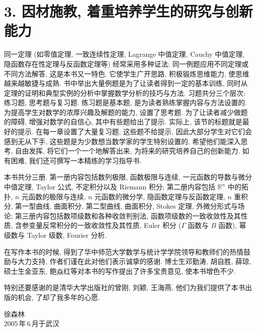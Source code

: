 \section*{3. 因材施教, 着重培养学生的研究与创新能力}

同一定理 (如零值定理, 一致连续性定理, Lagrange 中值定理, Cauchy 中值定理, 隐函数存在性定理与反函数定理等) 经常采用多种证法; 同一例题应用不同定理或不同方法解答, 这是本书又一特色. 它使学生广开思路, 积极锻炼思维能力, 使思维越来越敏捷与成熟. 书中举出大量例题是为了让读者得到一定的基本训练, 同时从定理的证明和典型实例的分析中掌握数学分析的技巧与方法. 习题共分三个层次: 练习题, 思考题与复习题. 练习题是基本题, 是为读者熟练掌握内容与方法设置的. 为提高学生对数学的浓厚兴趣及解题的能力, 设置了思考题. 为了让读者减少做题的障碍, 增强对数学的自信心, 其中有些题给出了提示. 实际上, 该节的标题就是最好的提示. 在每一章设置了大量复习题, 这些题不给提示, 因此大部分学生对它们会感到无从下手, 这些题是为少数想当数学家的学生特别设置的, 希望他们能深入思考, 自由发挥, 将它们一个一个地解答出来, 为将来的研究培养自己的创新能力. 如有困难, 我们还可撰写一本精练的学习指导书.

本书共分三册. 第一册内容包括数列极限, 函数极限与连续, 一元函数的导数与微分中值定理, Taylor 公式, 不定积分以及 Riemann 积分; 第二册内容包括 $\mathbb{R}^n$ 中的拓扑, $n$ 元函数的极限与连续, $n$ 元函数的微分学, 隐函数定理与反函数定理, $n$ 重积分, 第一型曲线, 曲面积分, 第二型曲线, 曲面积分, Stokes 定理, 外微分形式与场论; 第三册内容包括数项级数和各种收敛判别法, 函数项级数的一致收敛性及其性质, 含参变量反常积分的一致收敛性及其性质, Euler 积分 ($\Gamma$ 函数与 $B$ 函数), 幂级数与 Taylor 级数, Fourier 分析.

在写作本书的时候, 得到了华中师范大学数学与统计学学院领导和教师们的热情鼓励与大力支持, 作者们谨在此对他们表示诚挚的感谢. 博士生邓勤涛, 胡自胜, 薛琼, 硕士生金亚东, 鲍焱红等对本书的写作提出了许多宝贵意见, 使本书增色不少.

特别还要感谢的是清华大学出版社的曾刚, 刘颖, 王海燕, 他们为我们提供了本书出版的机会, 了却了我多年的心愿.

\vspace{1.5\baselineskip}
\begin{flushright}
  徐森林\\
  2005\,年\,6\,月于武汉
\end{flushright}
